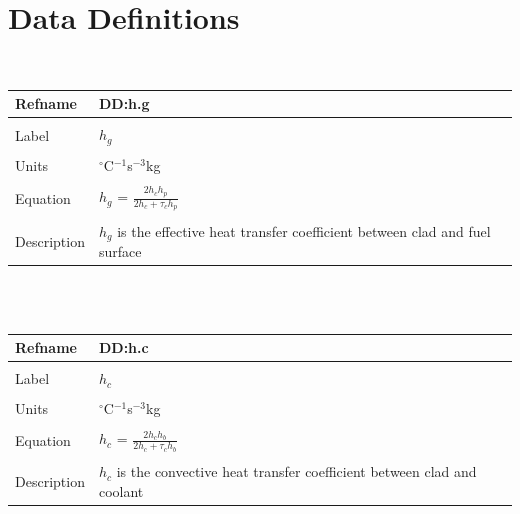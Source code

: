 \documentclass[preprint, 10pt]{sigplanconf}
\begin{document}
\section*{Data Definitions}
\label{Sec:DD}
~\newline \noindent \begin{minipage}{.7\textwidth}
\begin{tabular}{p{} p{}}
\toprule \textbf{Refname} & \textbf{DD:h.g}
\label{DD:h.g}
\\ \midrule \\
Label & $h_{g}$
\\ \midrule \\
Units & ${}^{\circ}$C$^{-1}$s$^{-3}$kg
\\ \midrule \\
Equation & $h_{g}$ = $\frac{2h_{c}h_{p}}{2h_{c}+\tau{}_{c}h_{p}}$
\\ \midrule \\
Description & $h_{g}$ is the effective heat transfer
coefficient between clad and fuel surface
\\ \bottomrule \end{tabular}
\end{minipage}\\
~\newline \noindent \begin{minipage}{.7\textwidth}
\begin{tabular}{p{} p{}}
\toprule \textbf{Refname} & \textbf{DD:h.c}
\label{DD:h.c}
\\ \midrule \\
Label & $h_{c}$
\\ \midrule \\
Units & ${}^{\circ}$C$^{-1}$s$^{-3}$kg
\\ \midrule \\
Equation & $h_{c}$ = $\frac{2h_{c}h_{b}}{2h_{c}+\tau{}_{c}h_{b}}$
\\ \midrule \\
Description & $h_{c}$ is the convective heat transfer
coefficient between clad and coolant
\\ \bottomrule \end{tabular}
\end{minipage}\\

%

\clearpage
\twocolumn



%
%
%
%
\end{document}
